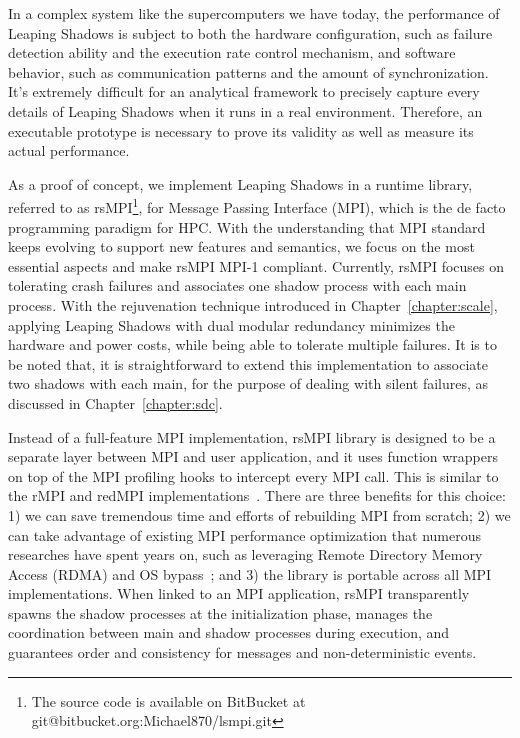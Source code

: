 In a complex system like the supercomputers we have today, the performance of Leaping Shadows is subject to both the hardware configuration, such as failure detection ability and the execution rate control mechanism, and software behavior, such as communication patterns and the amount of synchronization. 
It's extremely difficult for an analytical framework to precisely capture every details of Leaping Shadows when it runs in a real environment. Therefore, an executable prototype is necessary to prove its validity as well as measure its actual performance. 

As a proof of concept, we implement Leaping Shadows in a runtime library, referred to as rsMPI\footnote{The source code is available on BitBucket at git@bitbucket.org:Michael870/lsmpi.git}, for Message Passing Interface (MPI), which is the de facto programming paradigm for HPC. With the understanding that MPI standard keeps evolving to support new features and semantics, we focus on the most essential aspects and make rsMPI MPI-1 compliant. %
Currently, rsMPI focuses on tolerating crash failures and associates one shadow process with each main process. %
With the rejuvenation technique introduced in Chapter~\ref{chapter:scale}, applying Leaping Shadows with dual modular redundancy minimizes the hardware and power costs, while being able to tolerate multiple failures. It is to be noted that, it is straightforward to extend this implementation to associate two shadows with each main, for the purpose of dealing with silent failures, as discussed in Chapter~\ref{chapter:sdc}. 


Instead of a full-feature MPI implementation, rsMPI library is designed to be a separate layer between MPI and user application, and it uses function wrappers on top of the MPI profiling hooks to intercept every MPI call. This is similar to the rMPI and redMPI implementations~\cite{ferreira_sc_2011,fiala_2012_sdc}. There are three benefits for this choice: 1) we can save tremendous time and efforts of rebuilding MPI from scratch; 2) we can take advantage of existing MPI performance optimization that numerous researches have spent years on, such as leveraging Remote Directory
Memory Access (RDMA) and OS bypass~\cite{woodall2006high}; and 3) the library is portable across all MPI implementations. 
When linked to an MPI application, rsMPI transparently spawns the shadow processes at the initialization phase, manages the coordination between main and shadow processes during execution, and guarantees order and consistency for messages and non-deterministic events.

